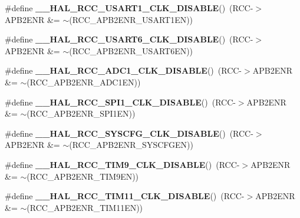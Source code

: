 \begin{DoxyCompactItemize}
\mbox{\label{group___r_c_c___a_p_b2___clock___enable___disable_gae0050944298552e9f02f56ec8634f5a6}} 
\#define {\bfseries \+\_\+\+\_\+\+H\+A\+L\+\_\+\+R\+C\+C\+\_\+\+U\+S\+A\+R\+T1\+\_\+\+C\+L\+K\+\_\+\+D\+I\+S\+A\+B\+LE}()~(R\+CC-\/$>$A\+P\+B2\+E\+NR \&= $\sim$(R\+C\+C\+\_\+\+A\+P\+B2\+E\+N\+R\+\_\+\+U\+S\+A\+R\+T1\+EN))
\item 
\mbox{\label{group___r_c_c___a_p_b2___clock___enable___disable_gac4b142412ef1e3dab8dcf5d5f7ca4d92}} 
\#define {\bfseries \+\_\+\+\_\+\+H\+A\+L\+\_\+\+R\+C\+C\+\_\+\+U\+S\+A\+R\+T6\+\_\+\+C\+L\+K\+\_\+\+D\+I\+S\+A\+B\+LE}()~(R\+CC-\/$>$A\+P\+B2\+E\+NR \&= $\sim$(R\+C\+C\+\_\+\+A\+P\+B2\+E\+N\+R\+\_\+\+U\+S\+A\+R\+T6\+EN))
\item 
\mbox{\label{group___r_c_c___a_p_b2___clock___enable___disable_ga80a9e4852bac07d3d9cc6390a361302a}} 
\#define {\bfseries \+\_\+\+\_\+\+H\+A\+L\+\_\+\+R\+C\+C\+\_\+\+A\+D\+C1\+\_\+\+C\+L\+K\+\_\+\+D\+I\+S\+A\+B\+LE}()~(R\+CC-\/$>$A\+P\+B2\+E\+NR \&= $\sim$(R\+C\+C\+\_\+\+A\+P\+B2\+E\+N\+R\+\_\+\+A\+D\+C1\+EN))
\item 
\mbox{\label{group___r_c_c___a_p_b2___clock___enable___disable_gaf2ccb5c6b63a60deb6463cbc629c10fe}} 
\#define {\bfseries \+\_\+\+\_\+\+H\+A\+L\+\_\+\+R\+C\+C\+\_\+\+S\+P\+I1\+\_\+\+C\+L\+K\+\_\+\+D\+I\+S\+A\+B\+LE}()~(R\+CC-\/$>$A\+P\+B2\+E\+NR \&= $\sim$(R\+C\+C\+\_\+\+A\+P\+B2\+E\+N\+R\+\_\+\+S\+P\+I1\+EN))
\item 
\mbox{\label{group___r_c_c___a_p_b2___clock___enable___disable_gaf04a5f1f0d6d8577706022a866f4528e}} 
\#define {\bfseries \+\_\+\+\_\+\+H\+A\+L\+\_\+\+R\+C\+C\+\_\+\+S\+Y\+S\+C\+F\+G\+\_\+\+C\+L\+K\+\_\+\+D\+I\+S\+A\+B\+LE}()~(R\+CC-\/$>$A\+P\+B2\+E\+NR \&= $\sim$(R\+C\+C\+\_\+\+A\+P\+B2\+E\+N\+R\+\_\+\+S\+Y\+S\+C\+F\+G\+EN))
\item 
\mbox{\label{group___r_c_c___a_p_b2___clock___enable___disable_ga6c858a3c7df429051fe4459a8a22da43}} 
\#define {\bfseries \+\_\+\+\_\+\+H\+A\+L\+\_\+\+R\+C\+C\+\_\+\+T\+I\+M9\+\_\+\+C\+L\+K\+\_\+\+D\+I\+S\+A\+B\+LE}()~(R\+CC-\/$>$A\+P\+B2\+E\+NR \&= $\sim$(R\+C\+C\+\_\+\+A\+P\+B2\+E\+N\+R\+\_\+\+T\+I\+M9\+EN))
\item 
\mbox{\label{group___r_c_c___a_p_b2___clock___enable___disable_ga2ea675ace35a7a536c9f4cec522f28bc}} 
\#define {\bfseries \+\_\+\+\_\+\+H\+A\+L\+\_\+\+R\+C\+C\+\_\+\+T\+I\+M11\+\_\+\+C\+L\+K\+\_\+\+D\+I\+S\+A\+B\+LE}()~(R\+CC-\/$>$A\+P\+B2\+E\+NR \&= $\sim$(R\+C\+C\+\_\+\+A\+P\+B2\+E\+N\+R\+\_\+\+T\+I\+M11\+EN))
\end{DoxyCompactItemize}


